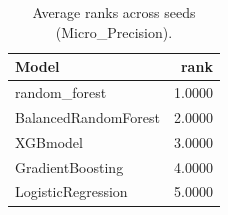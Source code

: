 \begin{table}[t]
\centering
\begin{tabular}{lr}
\toprule
Model & rank \\
\midrule
random_forest & 1.0000 \\
BalancedRandomForest & 2.0000 \\
XGBmodel & 3.0000 \\
GradientBoosting & 4.0000 \\
LogisticRegression & 5.0000 \\
\bottomrule
\end{tabular}
\caption{Average ranks across seeds (Micro_Precision).}
\label{tab:avg_rank_Micro_Precision}
\end{table}